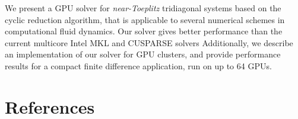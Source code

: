 \documentclass{elsarticle}
\begin{document}
We present a GPU solver for \emph{near-Toeplitz} tridiagonal systems
based on the cyclic reduction algorithm,
that is applicable to several numerical schemes
in computational fluid dynamics.
Our solver gives better performance than
the current multicore Intel MKL and CUSPARSE solvers
Additionally, we describe an implementation of our solver
for GPU clusters,
and provide performance results for a
compact finite difference application,
run on up to 64 GPUs.

\pagebreak
\section*{References}


\end{document}

